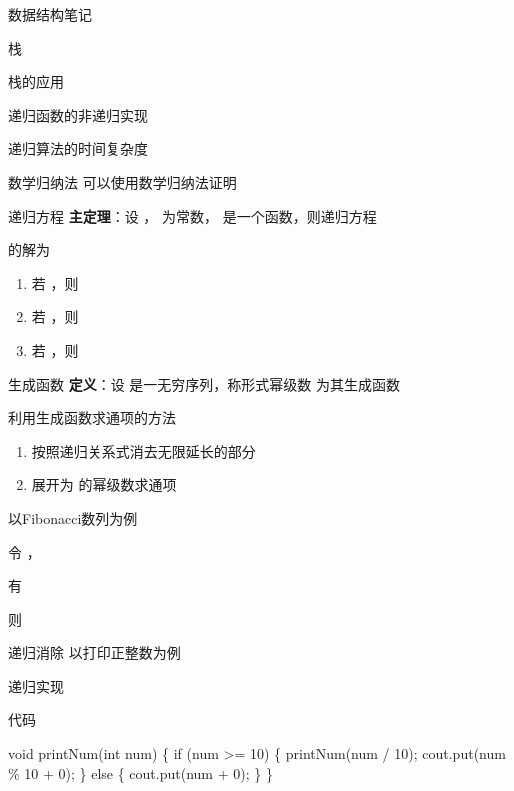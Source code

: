 \documentclass[
  ignorenonframetext,
]{beamer}
\newenvironment{Shaded}{}{}
\newcommand{\NormalTok}[1]{#1}
\providecommand{\tightlist}{%
  \setlength{\itemsep}{0pt}\setlength{\parskip}{0pt}}
\begin{document}
\begin{frame}[fragile]{数据结构笔记}
\begin{block}{栈}
\begin{block}{栈的应用}
\begin{block}{递归函数的非递归实现}
\begin{block}{递归算法的时间复杂度}
\begin{block}{数学归纳法}
可以使用数学归纳法证明 {}
\end{block}

\begin{block}{递归方程}
\protect{}\label{ux9012ux5f52ux65b9ux7a0b}
\textbf{主定理}：设 {}，{} 为常数，{} 是一个函数，则递归方程

的解为

\begin{enumerate}
\tightlist
\item
  若 {}，则 {}
\item
  若 {}，则 {}
\item
  若 {}，则 {}
\end{enumerate}
\end{block}

\begin{block}{生成函数}
\protect{}\label{ux751fux6210ux51fdux6570}
\textbf{定义}：设 {} 是一无穷序列，称形式幂级数 {} 为其生成函数

利用生成函数求通项的方法

\begin{enumerate}
\tightlist
\item
  按照递归关系式消去无限延长的部分
\item
  展开为 {} 的幂级数求通项
\end{enumerate}

以Fibonacci数列为例

令 {}，{}

有 {}

则
\end{block}
\end{block}
\end{block}

\begin{block}{递归消除}
\protect{}\label{ux9012ux5f52ux6d88ux9664}
以打印正整数为例

\begin{block}{递归实现}
\protect{}\label{ux9012ux5f52ux5b9eux73b0}
\begin{block}{代码}
\protect{}\label{ux4ee3ux7801}
\begin{Shaded}
\begin{Highlighting}[]
\NormalTok{void printNum(int num)}
\NormalTok{\{}
\NormalTok{  if (num \textgreater{}= 10)}
\NormalTok{  \{}
\NormalTok{    printNum(num / 10);}
\NormalTok{    cout.put(num \% 10 + \textquotesingle{}0\textquotesingle{});}
\NormalTok{  \}}
\NormalTok{  else}
\NormalTok{  \{}
\NormalTok{    cout.put(num + \textquotesingle{}0\textquotesingle{});}
\NormalTok{  \}}
\NormalTok{\}}
\end{Highlighting}
\end{Shaded}
\end{block}


\end{block}
\end{block}
\end{block}
\end{block}
\end{frame}
\end{document}
